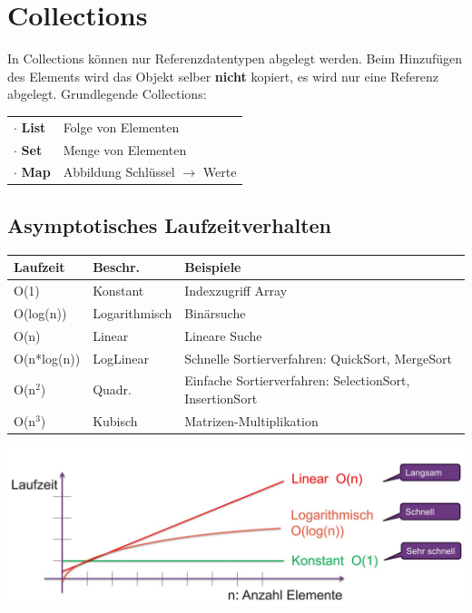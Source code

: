 \section{Collections}{\label{Collections}}
In Collections können nur Referenzdatentypen abgelegt werden. Beim Hinzufügen des Elements wird das Objekt selber \textbf{nicht} kopiert,
es wird nur eine Referenz abgelegt. Grundlegende Collections:
\begin{tabular}{l l}
    $\cdot$ \textbf{List} & Folge von Elementen \\
    $\cdot$ \textbf{Set}  & Menge von Elementen \\
    $\cdot$ \textbf{Map}  & Abbildung Schlüssel $\rightarrow$ Werte \\
\end{tabular}

\subsection{Asymptotisches Laufzeitverhalten}
\begin{tabularx}{\linewidth}{l l X} \hline
    \textbf{Laufzeit} & \textbf{Beschr.} & \textbf{Beispiele} \\ \hline
    O(1)        & Konstant      & Indexzugriff Array \\
    O(log(n))   & Logarithmisch & Binärsuche \\
    O(n)        & Linear        & Lineare Suche \\
    O(n*log(n)) & LogLinear     & Schnelle Sortierverfahren: QuickSort, MergeSort \\
    O(n$^2$)    & Quadr.        & Einfache Sortierverfahren: SelectionSort, InsertionSort \\
    O(n$^3$)    & Kubisch       & Matrizen-Multiplikation \\
\end{tabularx}

\includegraphics[width=\columnwidth]{pictures/laufzeit-collections.jpg}

\vfill\null
\columnbreak


